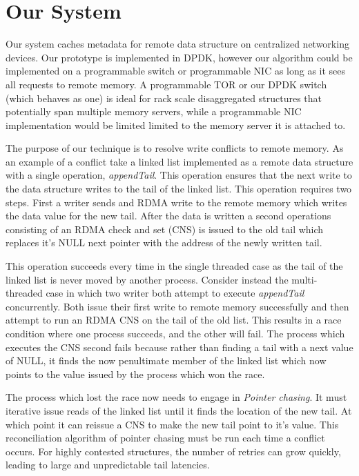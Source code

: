 \section{Our System}

Our system caches metadata for remote data structure on centralized
networking devices. Our prototype is implemented in DPDK, however our
algorithm could be implemented on a programmable switch or
programmable NIC as long as it sees all requests to remote memory. 
A programmable TOR or our DPDK switch (which behaves as one) is ideal
for rack scale disaggregated structures that potentially span multiple
memory servers, while a programmable NIC implementation would be
limited limited to the memory server it is attached to. 

The purpose of our technique is to resolve write conflicts to remote
memory. As an example of a conflict take a linked list implemented as
a remote data structure with a single operation, \textit{appendTail}.
This operation ensures that the next write to the data structure
writes to the tail of the linked list. This operation requires two
steps.  First a writer sends and RDMA write to the remote memory which
writes the data value for the new tail. After the data is written a
second operations consisting of an RDMA check and set (CNS) is issued
to the old tail which replaces it's NULL next pointer with the address
of the newly written tail.

This operation succeeds every time in the single threaded case as the
tail of the linked list is never moved by another process. Consider
instead the multi-threaded case in which two writer both attempt to
execute \textit{appendTail} concurrently. Both issue their first write
to remote memory successfully and then attempt to run an RDMA CNS on
the tail of the old list. This results in a race condition where one
process succeeds, and the other will fail. The process which executes
the CNS second fails because rather than finding a tail with a next
value of NULL, it finds the now penultimate member of the linked list
which now points to the value issued by the process which won the
race. 

The process which lost the race now needs to engage in \textit{Pointer
chasing}. It must iterative issue reads of the linked list until it
finds the location of the new tail. At which point it can reissue a
CNS to make the new tail point to it's value. This reconciliation
algorithm of pointer chasing must be run each time a conflict occurs.
For highly contested structures, the number of retries can grow
quickly, leading to large and unpredictable tail latencies.

